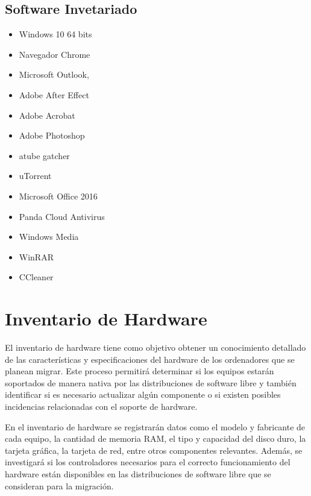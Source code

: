 		\vspace{0.3cm}
		
		\subsection{Software Invetariado}
			
			\begin{itemize}
				
				\item Windows 10 64 bits
				\item Navegador Chrome
				\item Microsoft Outlook,
				\item Adobe After Effect
				\item Adobe Acrobat
				\item Adobe Photoshop
				\item atube gatcher
				\item uTorrent
				\item Microsoft Office 2016
				\item Panda Cloud Antivirus
				\item Windows Media
				\item WinRAR
				\item CCleaner
			
			\end{itemize}
		
			\vspace{0.3cm}
		
	\section{Inventario de Hardware}
			
		El inventario de hardware tiene como objetivo obtener un conocimiento detallado de las características y especificaciones del hardware de los ordenadores que se planean migrar. Este proceso permitirá determinar si los equipos estarán soportados de manera nativa por las distribuciones de software libre y también identificar si es necesario actualizar algún componente o si existen posibles incidencias relacionadas con el soporte de hardware.\par

En el inventario de hardware se registrarán datos como el modelo y fabricante de cada equipo, la cantidad de memoria RAM, el tipo y capacidad del disco duro, la tarjeta gráfica, la tarjeta de red, entre otros componentes relevantes. Además, se investigará si los controladores necesarios para el correcto funcionamiento del hardware están disponibles en las distribuciones de software libre que se consideran para la migración.\par

